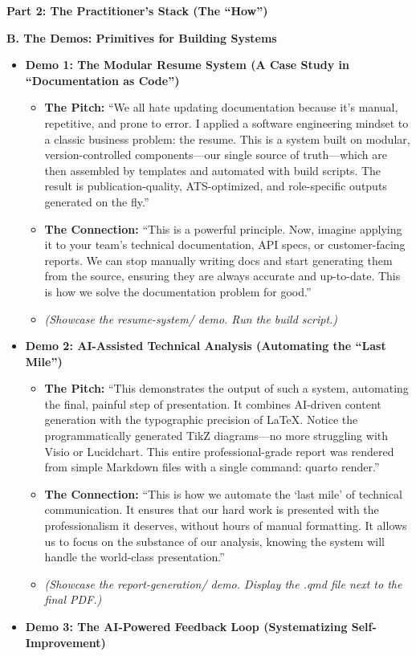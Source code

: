 \documentclass[
  ignorenonframetext,
  aspectratio=169,
]{beamer}
\providecommand{\tightlist}{%
  \setlength{\itemsep}{0pt}\setlength{\parskip}{0pt}}
\begin{document}
\begin{frame}{\textbf{Part 2: The Practitioner's Stack (The ``How'')}}
\begin{block}{\textbf{B. The Demos: Primitives for Building Systems}}
\begin{itemize}
\tightlist
\item
  \textbf{Demo 1: The Modular Resume System (A Case Study in
  ``Documentation as Code'')}

  \begin{itemize}
  \tightlist
  \item
    \textbf{The Pitch:} ``We all hate updating documentation because
    it's manual, repetitive, and prone to error. I applied a software
    engineering mindset to a classic business problem: the resume. This
    is a system built on modular, version-controlled components---our
    single source of truth---which are then assembled by templates and
    automated with build scripts. The result is publication-quality,
    ATS-optimized, and role-specific outputs generated on the fly.''\\
  \item
    \textbf{The Connection:} ``This is a powerful principle. Now,
    imagine applying it to your team's technical documentation, API
    specs, or customer-facing reports. We can stop manually writing docs
    and start generating them from the source, ensuring they are always
    accurate and up-to-date. This is how we solve the documentation
    problem for good.''\\
  \item
    \emph{(Showcase the resume-system/ demo. Run the build script.)}\\
  \end{itemize}
\item
  \textbf{Demo 2: AI-Assisted Technical Analysis (Automating the ``Last
  Mile'')}

  \begin{itemize}
  \tightlist
  \item
    \textbf{The Pitch:} ``This demonstrates the output of such a system,
    automating the final, painful step of presentation. It combines
    AI-driven content generation with the typographic precision of
    LaTeX. Notice the programmatically generated TikZ diagrams---no more
    struggling with Visio or Lucidchart. This entire professional-grade
    report was rendered from simple Markdown files with a single
    command: quarto render.''\\
  \item
    \textbf{The Connection:} ``This is how we automate the `last mile'
    of technical communication. It ensures that our hard work is
    presented with the professionalism it deserves, without hours of
    manual formatting. It allows us to focus on the substance of our
    analysis, knowing the system will handle the world-class
    presentation.''\\
  \item
    \emph{(Showcase the report-generation/ demo. Display the .qmd file
    next to the final PDF.)}\\
  \end{itemize}
\item
  \textbf{Demo 3: The AI-Powered Feedback Loop (Systematizing
  Self-Improvement)}


\end{itemize}
\end{block}
\end{frame}
\end{document}
